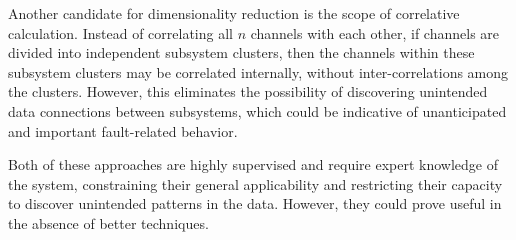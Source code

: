 Another candidate for dimensionality reduction is the scope of correlative calculation. Instead of correlating all $n$ channels with each other, if channels are divided into independent subsystem clusters, then the channels within these subsystem clusters may be correlated internally, without inter-correlations among the clusters. However, this eliminates the possibility of discovering unintended data connections between subsystems, which could be indicative of unanticipated and important fault-related behavior.

Both of these approaches are highly supervised and require expert knowledge of the system, constraining their general applicability and restricting their capacity to discover unintended patterns in the data. However, they could prove useful in the absence of better techniques.











